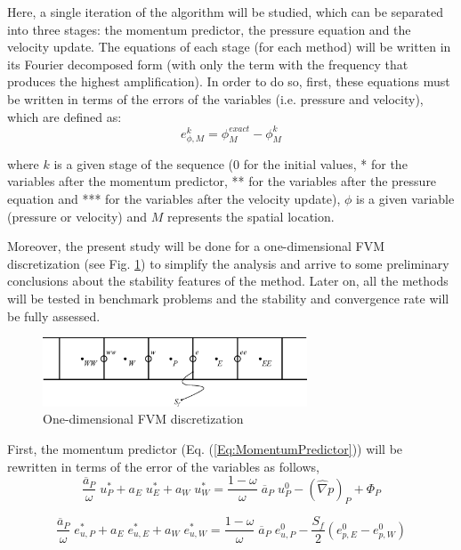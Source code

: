 \documentclass[final,3p,times,11pt,onecolumn]{myElsarticle}
\numberwithin{equation}{section}
\begin{document}
Here, a single iteration of the algorithm will be studied, which can be separated into three stages: the momentum predictor, the pressure equation and the velocity update. The equations of each stage (for each method) will be written in its Fourier decomposed form (with only the term with the frequency that produces the highest amplification). In order to do so, first, these equations must be written in terms of the errors of the variables (i.e. pressure and velocity), which are defined as:
\begin{equation}
    e^k_{\phi,M} = \phi^{exact}_{M}-\phi_M^{k}
\end{equation}

\noindent where $k$ is a given stage of the sequence ($0$ for the initial values, * for the variables after the momentum predictor, ** for the variables after the pressure equation and *** for the variables after the velocity update), $\phi$ is a given variable (pressure or velocity) and $M$ represents the spatial location.

Moreover, the present study will be done for a one-dimensional FVM discretization (see Fig. \ref{fig:4a}) to simplify the analysis and arrive to some preliminary conclusions about the stability features of the method. Later on, all the methods will be tested in benchmark problems and the stability and convergence rate will be fully assessed. 

\begin{figure}[t!]
    \centering
    \includegraphics[width=0.7\textwidth]{fig/cells.eps}
    \caption{One-dimensional FVM discretization}
    \label{fig:4a}
\end{figure}

First, the momentum predictor (Eq. (\ref{Eq:MomentumPredictor})) will be rewritten in terms of the error of the variables as follows,
\begin{equation}
    \dfrac{\overline{a}_P}{\omega} \; u_P^* + a_E \; u_E^* + a_W \; u_W^* = \dfrac{1-\omega}{\omega} \; \overline{a}_P \; u_P^0 - (\hat{\nabla} p)_P + \Phi_P
\end{equation}

\begin{equation}
    \dfrac{\overline{a}_P}{\omega} \; e_{u,P}^* + a_E \; e_{u,E}^* + a_W \; e_{u,W}^* = \dfrac{1-\omega}{\omega} \; \overline{a}_P \; e_{u,P}^0 - \dfrac{S_f}{2} (e^0_{p,E}-e^0_{p,W})
    \label{eq:MPerror}
\end{equation}
\end{document}
